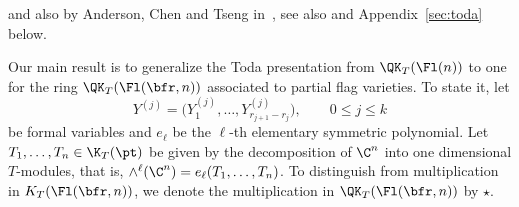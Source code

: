 and also by Anderson, Chen and Tseng in~\cite{act:2017}, see also
\cite{koroteev} and Appendix~\ref{sec:toda} below.

Our main result is to generalize the Toda presentation from $\QK_T(\Fl(n))$
to one for the ring
$\QK_T(\Fl(\bfr,n))$ associated to partial flag varieties. To state it, let
\[
Y^{(j)}=\bigl(Y^{(j)}_1,\dots,{ Y^{(j)}_{r_{j+1}-r_j}}\bigr), \qquad 0\leq j\leq k
\]
be formal variables and $e_\ell$ be the $\ell$-th elementary symmetric polynomial. Let $T_1,\dots, T_n \in \K_T(\pt)$ be given by
the decomposition of $\C^n$ into one dimensional $T$-modules, that is, $\wedge^\ell(\C^n)=e_\ell(T_1,\dots,T_n)$. To distinguish from multiplication in $K_T(\Fl(\bfr,n))$, we denote the multiplication in $\QK_T(\Fl(\bfr,n))$ by $\star$.

